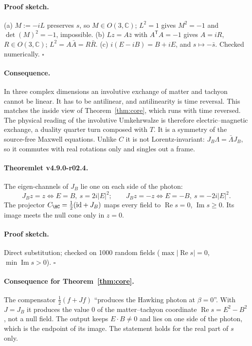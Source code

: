 \paragraph{Proof sketch.}
(a) \(M:=-iL\) preserves \(s\), so \(M\in O(3,\mathbb C)\); \(L^2=1\) gives \(M^2=-1\) and \(\det(M)^2=-1\), impossible.
(b) \(Lz=A\bar z\) with \(A^{\mathsf T}A=-1\) gives \(A=iR\), \(R\in O(3,\mathbb C)\); \(L^2=A\bar A=R\bar R\).
(c) \(i(E-iB)=B+iE\), and \(s\mapsto-\bar s\).  Checked numerically.  \(\square\)

\paragraph{Consequence.}
In three complex dimensions an involutive exchange of matter and tachyon cannot be linear.  It has to be antilinear,
and antilinearity is time reversal.  This matches the inside view of Theorem~\ref{thm:core}, which runs with time
reversed.  The physical reading of the involutive Umkehrwalze is therefore electric--magnetic exchange, a duality
quarter turn composed with \(T\).  It is a symmetry of the source-free Maxwell equations.  Unlike \(C\) it is not
Lorentz-invariant: \(J_B\Lambda=\bar\Lambda J_B\), so it commutes with real rotations only and singles out a frame.

\paragraph{Theoremlet v4.9.0-r02.4.}
The eigen-channels of \(J_B\) lie one on each side of the photon:
\[
J_Bz=z\iff E=B,\ s=2i|E|^2;\qquad J_Bz=-z\iff E=-B,\ s=-2i|E|^2.
\]
The projector \(C_{\HC}=\tfrac12(\mathrm{id}+J_B)\) maps every field to \(\operatorname{Re}s=0\),
\(\operatorname{Im}s\ge0\).  Its image meets the null cone only in \(z=0\).

\paragraph{Proof sketch.}
Direct substitution; checked on 1000 random fields (\(\max|\operatorname{Re}s|=0\), \(\min\operatorname{Im}s>0\)).
\(\square\)

\paragraph{Consequence for Theorem~\ref{thm:core}.}
The compensator \(\tfrac12(f+Jf)\) ``produces the Hawking photon at \(\beta=0\)''.  With \(J=J_B\) it produces the value
\(0\) of the matter--tachyon coordinate \(\operatorname{Re}s=E^2-B^2\), not a null field.  The output keeps
\(E\cdot B\neq0\) and lies on one side of the photon, which is the endpoint of its image.  The statement holds for the real
part of \(s\) only.

